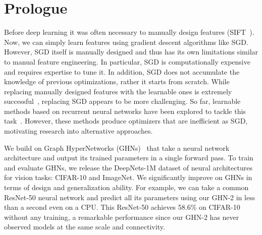 \section*{Prologue}


\vspace{5pt}
Before deep learning it was often necessary to manually design features (\eg SIFT~\citep{lowe2004distinctive}). Now, we can simply learn features using gradient descent algorithms like SGD. However, SGD itself is manually designed and thus has its own limitations similar to manual feature engineering. In particular, SGD is computationally expensive and requires expertise to tune it. In addition, SGD does not accumulate the knowledge of previous optimizations, rather it starts from scratch. While replacing manually designed features with the learnable ones is extremely successful~\citep{krizhevsky2012imagenet}, replacing SGD appears to be more challenging. So far, learnable methods based on recurrent neural networks have been explored to tackle this task~\citep{andrychowicz2016learning}. However, these methods produce optimizers that are inefficient as SGD, motivating research into alternative approaches.


We build on Graph HyperNetworks (GHNs)~\citep{zhang2018graph} that take a neural network architecture and output its trained parameters in a single forward pass. To train and evaluate GHNs, we release the DeepNets-1M dataset of neural architectures for vision tasks: CIFAR-10 and ImageNet. We significantly improve on GHNs in terms of design and generalization ability. For example, we can take a common ResNet-50 neural network and predict all its parameters using our GHN-2 in less than a second even on a CPU. This ResNet-50 achieves 58.6\% on CIFAR-10 without any training, a remarkable performance since our GHN-2 has never observed models at the same scale and connectivity.

